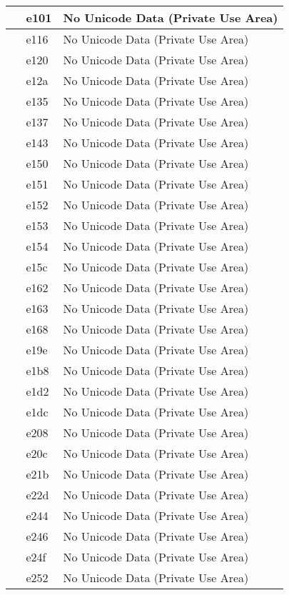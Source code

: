 \documentclass[12pt,letterpaper,openany]{book}
\begin{document}
\begin{center}
\begin{supertabular}{|m{0.25in}|m{0.5in}|m{4in}|}
 & e101 & No Unicode Data (Private Use Area)\\\hline
 & e116 & No Unicode Data (Private Use Area)\\\hline
 & e120 & No Unicode Data (Private Use Area)\\\hline
 & e12a & No Unicode Data (Private Use Area)\\\hline
 & e135 & No Unicode Data (Private Use Area)\\\hline
 & e137 & No Unicode Data (Private Use Area)\\\hline
 & e143 & No Unicode Data (Private Use Area)\\\hline
 & e150 & No Unicode Data (Private Use Area)\\\hline
 & e151 & No Unicode Data (Private Use Area)\\\hline
 & e152 & No Unicode Data (Private Use Area)\\\hline
 & e153 & No Unicode Data (Private Use Area)\\\hline
 & e154 & No Unicode Data (Private Use Area)\\\hline
 & e15c & No Unicode Data (Private Use Area)\\\hline
 & e162 & No Unicode Data (Private Use Area)\\\hline
 & e163 & No Unicode Data (Private Use Area)\\\hline
 & e168 & No Unicode Data (Private Use Area)\\\hline
 & e19e & No Unicode Data (Private Use Area)\\\hline
 & e1b8 & No Unicode Data (Private Use Area)\\\hline
 & e1d2 & No Unicode Data (Private Use Area)\\\hline
 & e1dc & No Unicode Data (Private Use Area)\\\hline
 & e208 & No Unicode Data (Private Use Area)\\\hline
 & e20c & No Unicode Data (Private Use Area)\\\hline
 & e21b & No Unicode Data (Private Use Area)\\\hline
 & e22d & No Unicode Data (Private Use Area)\\\hline
 & e244 & No Unicode Data (Private Use Area)\\\hline
 & e246 & No Unicode Data (Private Use Area)\\\hline
 & e24f & No Unicode Data (Private Use Area)\\\hline
 & e252 & No Unicode Data (Private Use Area)\\\hline

\end{supertabular}
\end{center}
\end{document}
